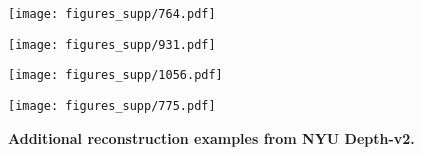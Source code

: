 \documentclass[final]{cvpr}
\begin{document}
\begin{figure*}
\centering
\begin{minipage}{0.99\textwidth}
\centering
   \texttt{[image: figures\_supp/764.pdf]}
   \vspace{2cm}
\end{minipage}

\begin{minipage}{0.99\textwidth}
\centering
   \texttt{[image: figures\_supp/931.pdf]}
   \vspace{2cm}
\end{minipage}

\begin{minipage}{0.99\textwidth}
\centering
   \texttt{[image: figures\_supp/1056.pdf]}
   \vspace{2cm}
\end{minipage}
\begin{minipage}{0.99\textwidth}
\centering
   \texttt{[image: figures\_supp/775.pdf]}
   \vspace{1cm}
\end{minipage}
\caption{\textbf{Additional reconstruction examples from NYU Depth-v2.}}
\label{fig:nyu_3d_viz}
\end{figure*}
\end{document}
